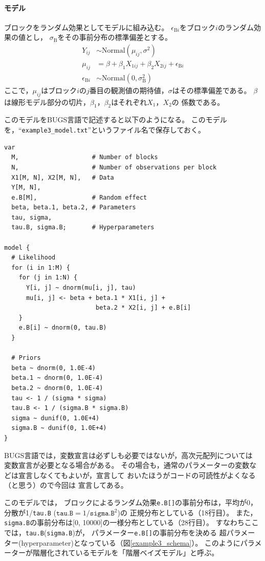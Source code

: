 \documentclass[11pt,uplatex]{jsarticle}
\begin{document}
\paragraph{モデル}
ブロックをランダム効果としてモデルに組み込む。
$\epsilon_{\mathrm{B}i}$をブロック$i$のランダム効果の値とし，
$\sigma_\mathrm{B}$をその事前分布の標準偏差とする。
\begin{align*}
Y_{ij} &\sim \mathrm{Normal}(\mu_{ij}, \sigma^{2}) \\
\mu_{ij} &= \beta + \beta_{1} X_{1ij} + \beta_{2} X_{2ij} + \epsilon_{\mathrm{B}i} \\
\epsilon_{\mathrm{B}i} &\sim \mathrm{Normal}(0, \sigma_\mathrm{B}^{2})
\end{align*}
\noindent
ここで，$\mu_{ij}$はブロック$i$の$j$番目の観測値の期待値，$\sigma$はその標準偏差である。
$\beta$は線形モデル部分の切片，$\beta_{1}$，$\beta_{2}$はそれぞれ$X_{1}$，$X_{2}$の
係数である。

このモデルをBUGS言語で記述すると以下のようになる。
このモデルを，``\texttt{example3\_model.txt}''というファイル名で保存しておく。

\begin{lstlisting}
var
  M,                    # Number of blocks
  N,                    # Number of observations per block
  X1[M, N], X2[M, N],   # Data
  Y[M, N],
  e.B[M],               # Random effect
  beta, beta.1, beta.2, # Parameters
  tau, sigma, 
  tau.B, sigma.B;       # Hyperparameters

model {
  # Likelihood
  for (i in 1:M) {
    for (j in 1:N) {
      Y[i, j] ~ dnorm(mu[i, j], tau)
      mu[i, j] <- beta + beta.1 * X1[i, j] +
                         beta.2 * X2[i, j] + e.B[i]
    }
    e.B[i] ~ dnorm(0, tau.B)
  }

  # Priors
  beta ~ dnorm(0, 1.0E-4)
  beta.1 ~ dnorm(0, 1.0E-4)
  beta.2 ~ dnorm(0, 1.0E-4)
  tau <- 1 / (sigma * sigma)
  tau.B <- 1 / (sigma.B * sigma.B)
  sigma ~ dunif(0, 1.0E+4)
  sigma.B ~ dunif(0, 1.0E+4)
}
\end{lstlisting}

BUGS言語では，変数宣言は必ずしも必要ではないが，高次元配列については
変数宣言が必要となる場合がある。
その場合も，通常のパラメーターの変数などは宣言しなくてもよいが，宣言して
おいたほうがコードの可読性がよくなる（と思う）ので今回は
宣言してある。

このモデルでは，
ブロックによるランダム効果\texttt{e.B[]}の事前分布は，平均が0，分散が1/\texttt{tau.B}
($\texttt{tau.B}=1/\texttt{sigma.B}^{2}$)の
正規分布としている（18行目）。
また，\texttt{sigma.B}の事前分布は[0, 10000]の一様分布としている（28行目）。
すなわちここでは，\texttt{tau.B}(\texttt{sigma.B})が，
パラメーター\texttt{e.B[]}の事前分布を決める
超パラメーター(hyperparameter)となっている（図\ref{example3_schema}）。
このようにパラメーターが階層化されているモデルを「階層ベイズモデル」と呼ぶ。
\end{document}
